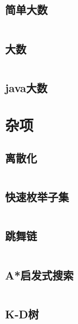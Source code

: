 \inputminted{cpp}{code/Matrix01.cc}

\subsection{简单大数} 

\inputminted{text}{code/DataAnalysis.cc }

\subsection{大数} 

\inputminted{cpp}{code/Bignum.cc}

\subsection{java大数} 



\newpage\section{杂项} 
\subsection{离散化} 

\inputminted{cpp}{code/discretization.cc}

\subsection{快速枚举子集} 

\inputminted{cpp}{code/EnumSubset.cc}

\subsection{跳舞链} 

\inputminted{cpp}{code/DLX.cc}

\subsection{A*启发式搜索} 

\inputminted{cpp}{code/A*启发式搜索.cc}

\subsection{K-D树} 

\inputminted{cpp}{code/KDTree.cc}

